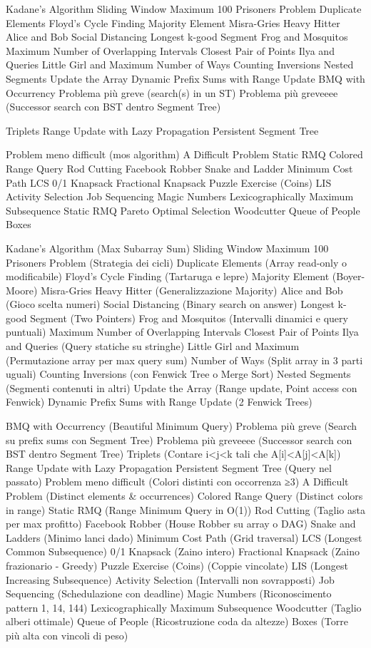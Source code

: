 Kadane's Algorithm 
Sliding Window Maximum
100 Prisoners Problem 
Duplicate Elements
Floyd's Cycle Finding
Majority Element
Misra-Gries Heavy Hitter
Alice and Bob
Social Distancing
Longest k-good Segment 
Frog and Mosquitos
Maximum Number of Overlapping Intervals
Closest Pair of Points
Ilya and Queries
Little Girl and Maximum
Number of Ways
Counting Inversions
Nested Segments
Update the Array 
Dynamic Prefix Sums with Range Update
BMQ with Occurrency
Problema più greve (search(s) in un ST)
Problema più greveeee (Successor search con BST dentro Segment Tree)

Triplets
Range Update with Lazy Propagation
Persistent Segment Tree


Problem meno difficult (mos algorithm)
A Difficult Problem 
Static RMQ 
Colored Range Query
Rod Cutting 
Facebook Robber
Snake and Ladder
Minimum Cost Path
LCS
0/1 Knapsack
Fractional Knapsack
Puzzle Exercise (Coins)
LIS
Activity Selection
Job Sequencing 
Magic Numbers
Lexicographically Maximum Subsequence
Static RMQ 
Pareto Optimal Selection
Woodcutter 
Queue of People 
Boxes 





Kadane's Algorithm (Max Subarray Sum)
Sliding Window Maximum
100 Prisoners Problem (Strategia dei cicli)
Duplicate Elements (Array read-only o modificabile)
Floyd's Cycle Finding (Tartaruga e lepre)
Majority Element (Boyer-Moore)
Misra-Gries Heavy Hitter (Generalizzazione Majority)
Alice and Bob (Gioco scelta numeri)
Social Distancing (Binary search on answer)
Longest k-good Segment (Two Pointers)
Frog and Mosquitos (Intervalli dinamici e query puntuali)
Maximum Number of Overlapping Intervals
Closest Pair of Points
Ilya and Queries (Query statiche su stringhe)
Little Girl and Maximum (Permutazione array per max query sum)
Number of Ways (Split array in 3 parti uguali)
Counting Inversions (con Fenwick Tree o Merge Sort)
Nested Segments (Segmenti contenuti in altri)
Update the Array (Range update, Point access con Fenwick)
Dynamic Prefix Sums with Range Update (2 Fenwick Trees)

BMQ with Occurrency (Beautiful Minimum Query)
Problema più greve (Search su prefix sums con Segment Tree)
Problema più greveeee (Successor search con BST dentro Segment Tree)
Triplets (Contare i<j<k tali che A[i]<A[j]<A[k])
Range Update with Lazy Propagation
Persistent Segment Tree (Query nel passato)
Problem meno difficult (Colori distinti con occorrenza ≥3)
A Difficult Problem (Distinct elements & occurrences)
Colored Range Query (Distinct colors in range)
Static RMQ (Range Minimum Query in O(1))
Rod Cutting (Taglio asta per max profitto)
Facebook Robber (House Robber su array o DAG)
Snake and Ladders (Minimo lanci dado)
Minimum Cost Path (Grid traversal)
LCS (Longest Common Subsequence)
0/1 Knapsack (Zaino intero)
Fractional Knapsack (Zaino frazionario - Greedy)
Puzzle Exercise (Coins) (Coppie vincolate)
LIS (Longest Increasing Subsequence)
Activity Selection (Intervalli non sovrapposti)
Job Sequencing (Schedulazione con deadline)
Magic Numbers (Riconoscimento pattern 1, 14, 144)
Lexicographically Maximum Subsequence
Woodcutter (Taglio alberi ottimale)
Queue of People (Ricostruzione coda da altezze)
Boxes (Torre più alta con vincoli di peso)

